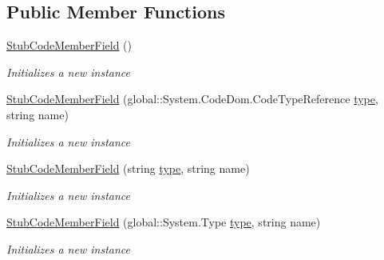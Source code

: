 \subsection*{Public Member Functions}
\begin{DoxyCompactItemize}
\item 
\hyperlink{class_system_1_1_code_dom_1_1_fakes_1_1_stub_code_member_field_ac07300aa01e909606b8f8ab5bdf7c937}{Stub\-Code\-Member\-Field} ()
\begin{DoxyCompactList}\small\item\em Initializes a new instance\end{DoxyCompactList}\item 
\hyperlink{class_system_1_1_code_dom_1_1_fakes_1_1_stub_code_member_field_aff139d29511c8a4422cb76c419247206}{Stub\-Code\-Member\-Field} (global\-::\-System.\-Code\-Dom.\-Code\-Type\-Reference \hyperlink{jquery-1_810_82-vsdoc_8js_a3940565e83a9bfd10d95ffd27536da91}{type}, string name)
\begin{DoxyCompactList}\small\item\em Initializes a new instance\end{DoxyCompactList}\item 
\hyperlink{class_system_1_1_code_dom_1_1_fakes_1_1_stub_code_member_field_a9969eb4998b0bef0627f1278a2b2830b}{Stub\-Code\-Member\-Field} (string \hyperlink{jquery-1_810_82-vsdoc_8js_a3940565e83a9bfd10d95ffd27536da91}{type}, string name)
\begin{DoxyCompactList}\small\item\em Initializes a new instance\end{DoxyCompactList}\item 
\hyperlink{class_system_1_1_code_dom_1_1_fakes_1_1_stub_code_member_field_a0daafc83c0e4e0da15ea8f2b3d707ade}{Stub\-Code\-Member\-Field} (global\-::\-System.\-Type \hyperlink{jquery-1_810_82-vsdoc_8js_a3940565e83a9bfd10d95ffd27536da91}{type}, string name)
\begin{DoxyCompactList}\small\item\em Initializes a new instance\end{DoxyCompactList}\end{DoxyCompactItemize}
